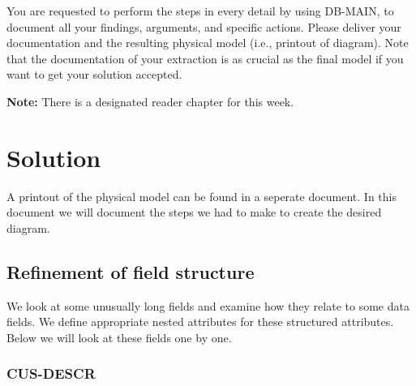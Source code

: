 \documentclass[11pt]{article}
\begin{document}
You are requested to perform the steps in every detail by using DB-MAIN, to document
all your findings, arguments, and specific actions. Please deliver your documentation
and the resulting physical model (i.e., printout of diagram). Note that the documentation
of your extraction is as crucial as the final model if you want to get your solution
accepted.

\textbf{Note:} There is a designated reader chapter for this week.


\newpage

\section{Solution}

A printout of the physical model can be found in a seperate document. In this document we will document the steps we had to make to create the desired diagram.


\subsection{Refinement of field structure}

We look at some unusually long fields and examine how they relate to some data fields. We define appropriate nested attributes for these structured attributes. Below we will look at these fields one by one.


\subsubsection{CUS-DESCR}
\end{document}
